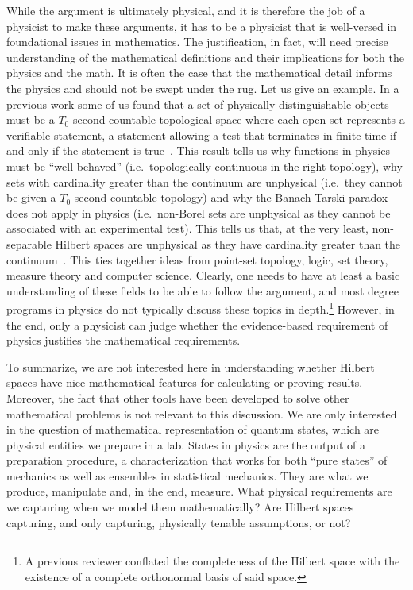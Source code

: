 \documentclass[10pt,twocolumn, nofootinbib]{revtex4-2}
\begin{document}
While the argument is ultimately physical, and it is therefore the job of a physicist to make these arguments, it has to be a physicist that is well-versed in foundational issues in mathematics. The justification, in fact, will need precise understanding of the mathematical definitions and their implications for both the physics and the math. It is often the case that the mathematical detail informs the physics and should not be swept under the rug.  Let us give an example. In a previous work some of us found that a set of physically distinguishable objects must be a $T_0$ second-countable topological space where each open set represents a verifiable statement, a statement allowing a test that terminates in finite time if and only if the statement is true~\cite{aop-book}. This result tells us why functions in physics must be ``well-behaved'' (i.e.~topologically continuous in the right topology), why sets with cardinality greater than the continuum are unphysical (i.e.~they cannot be given a $T_0$ second-countable topology) and why the Banach-Tarski paradox does not apply in physics (i.e.~non-Borel sets are unphysical as they cannot be associated with an experimental test). This tells us that, at the very least, non-separable Hilbert spaces are unphysical as they have cardinality greater than the continuum~\cite{Earman2020}. This ties together ideas from point-set topology, logic, set theory, measure theory and computer science. Clearly, one needs to have at least a basic understanding of these fields to be able to follow the argument, and most degree programs in physics do not typically discuss these topics in depth.\footnote{A previous reviewer conflated the completeness of the Hilbert space with the existence of a complete orthonormal basis of said space.} However, in the end, only a physicist can judge whether the evidence-based requirement of physics justifies the mathematical requirements.

To summarize, we are not interested here in understanding whether Hilbert spaces have nice mathematical features for calculating or proving results. Moreover, the fact that other tools have been developed to solve other mathematical problems is not relevant to this discussion. We are only interested in the question of mathematical representation of quantum states, which are physical entities we prepare in a lab. States in physics are the output of a preparation procedure, a characterization that works for both ``pure states'' of mechanics as well as ensembles in statistical mechanics. They are what we produce, manipulate and, in the end, measure. What physical requirements are we capturing when we model them mathematically? Are Hilbert spaces capturing, and only capturing, physically tenable assumptions, or not?  
\end{document}
